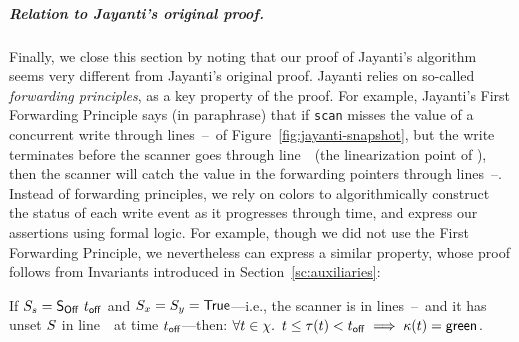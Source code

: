 

\subparagraph*{Relation to Jayanti's original proof.}
\label{sec:relat-jayant-orig}
%
Finally, we close this section by noting that our proof of Jayanti's
algorithm seems very different from Jayanti's original proof. Jayanti
relies on so-called \emph{forwarding principles}, as a key property of
the proof. For example, Jayanti's First Forwarding Principle says (in
paraphrase) that if {\tt scan} misses the value of a concurrent write
through lines~\lineScanReadsX--\lineScanReadsY\ of
Figure~\ref{fig:jayanti-snapshot}, but the write terminates before the
scanner goes through line~\lineScanUnsetsS\ (the linearization point
of \jyscan), then the scanner will catch the value in the forwarding
pointers through lines~\lineScanReadsFX--\lineScanReadsFY.
%
Instead of forwarding principles, we rely on colors to algorithmically
construct the status of each write event as it progresses through
time, and express our assertions using formal logic. For example,
though we did not use the First Forwarding Principle, we nevertheless
can express a similar property, whose proof follows from
Invariants introduced in Section~\ref{sc:auxiliaries}:
%
\begin{myprop}\label{inv:fwd1}%
If $S_s = \mathsf{S_{Off}}\ t_{\mathsf{off}}$ and $S_x = S_y = \mathsf{True}$---i.e., the scanner is
in lines~\lineScanReadsFX--\lineScanChoosesRY\ and it has unset $S$
in line~\lineScanUnsetsS\ at time $t_{\mathsf{off}}$---then: $ \forall t \in
\chi\mathord{.}\,\ t \leq \tau(t)< t_{\mathsf{off}} \implies \kappa(t)= \mathsf{green}$.
\end{myprop}

